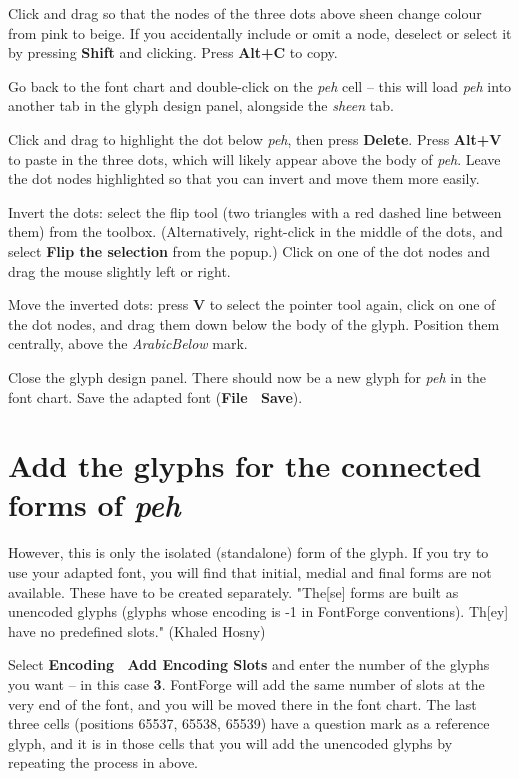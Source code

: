 Click and drag so that the nodes of the three dots above sheen change colour from pink to beige.  If you accidentally include or omit a node, deselect or select it by pressing \textbf{Shift} and clicking.  Press \textbf{Alt+C} to copy.

Go back to the font chart and double-click on the \textit{peh} cell -- this will load \textit{peh} into another tab in the glyph design panel, alongside the \textit{sheen} tab.

Click and drag to highlight the dot below \textit{peh}, then press \textbf{Delete}.  Press \textbf{Alt+V} to paste in the three dots, which will likely appear above the body of \textit{peh}.  Leave the dot nodes highlighted so that you can invert and move them more easily.

Invert the dots: select the flip tool (two triangles with a red dashed line between them) from the toolbox.  (Alternatively, right-click in the middle of the dots, and select \textbf{Flip the selection} from the popup.)  Click on one of the dot nodes and drag the mouse slightly left or right.

Move the inverted dots: press \textbf{V} to select the pointer tool again, click on one of the dot nodes, and drag them down below the body of the glyph.  Position them centrally, above the \textit{ArabicBelow} mark.

Close the glyph design panel. There should now be a new glyph for \textit{peh} in the font chart.  Save the adapted font (\textbf{File \textrightarrow\ Save}).


\section{Add the glyphs for the connected forms of \textit{peh}}

However, this is only the isolated (standalone) form of the glyph.  If you try to use your adapted font, you will find that initial, medial and final forms are not available.  These have to be created separately.  "The[se] forms are built as unencoded glyphs (glyphs whose encoding is -1 in FontForge conventions).  Th[ey] have no predefined slots." (Khaled Hosny)

Select \textbf{Encoding \textrightarrow\ Add Encoding Slots} and enter the number of the glyphs you want -- in this case \textbf{3}.  FontForge will add the same number of slots at the very end of the font, and you will be moved there in the font chart.  The last three cells (positions 65537, 65538, 65539) have a question mark as a reference glyph, and it is in those cells that you will add the unencoded glyphs by repeating the process in  above.

